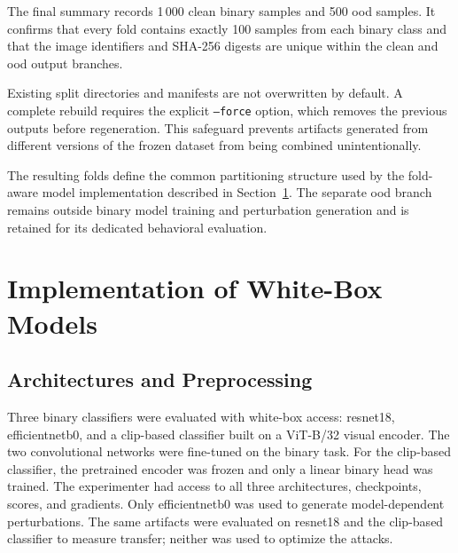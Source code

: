 The final summary records 1\,000 clean binary samples and 500 \gls{ood}
samples. It confirms that every fold contains exactly 100 samples from each
binary class and that the image identifiers and SHA-256 digests are unique
within the clean and \gls{ood} output branches.

Existing split directories and manifests are not overwritten by default. A
complete rebuild requires the explicit \texttt{--force} option, which removes
the previous outputs before regeneration. This safeguard prevents artifacts
generated from different versions of the frozen dataset from being combined
unintentionally.

The resulting folds define the common partitioning structure used by the
fold-aware model implementation described in
Section~\ref{sec:implementation-proxy-models}. The separate \gls{ood} branch
remains outside binary model training and perturbation generation and is
retained for its dedicated behavioral evaluation.

\section{Implementation of White-Box Models}
\label{sec:implementation-proxy-models}

\subsection{Architectures and Preprocessing}
\label{subsec:implementation-architectures}

Three binary classifiers were evaluated with white-box access: \gls{resnet18},
\gls{efficientnetb0}, and a \gls{clip}-based classifier built on a ViT-B/32
visual encoder. The two convolutional networks were fine-tuned on the binary
task. For the \gls{clip}-based classifier, the pretrained encoder was frozen
and only a linear binary head was trained. The experimenter had access to all
three architectures, checkpoints, scores, and gradients.
Only \gls{efficientnetb0} was used to generate model-dependent perturbations.
The same artifacts were evaluated on \gls{resnet18} and the \gls{clip}-based
classifier to measure transfer; neither was used to optimize the attacks.

